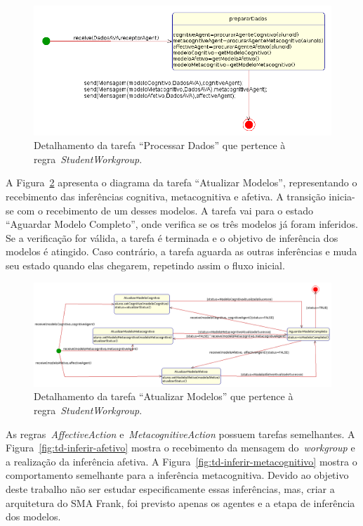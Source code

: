 \begin{figure}
	\centering
	\includegraphics[scale=0.48]{images/td-processar-dados.png}
	\caption{Detalhamento da tarefa ``Processar Dados'' que pertence à regra~\emph{StudentWorkgroup}.}
	\label{fig:td-processar-dados}
\end{figure}

A Figura~\ref{fig:td-atualizar-modelos} apresenta o diagrama da tarefa ``Atualizar Modelos'', representando o recebimento das inferências cognitiva, metacognitiva e afetiva. A transição inicia-se com o recebimento de um desses modelos. A tarefa vai para o estado ``Aguardar Modelo Completo'', onde verifica se os três modelos já foram inferidos. Se a verificação for válida, a tarefa é terminada e o objetivo de inferência dos modelos é atingido. Caso contrário, a tarefa aguarda as outras inferências e muda seu estado quando elas chegarem, repetindo assim o fluxo inicial.

\begin{figure}
	\centering
	\includegraphics[scale=0.4]{images/td-atualizar-modelos.png}
	\caption{Detalhamento da tarefa ``Atualizar Modelos'' que pertence à regra~\emph{StudentWorkgroup}.}
	\label{fig:td-atualizar-modelos}
\end{figure}

As regras~\emph{AffectiveAction} e~\emph{MetacognitiveAction} possuem tarefas semelhantes. A Figura~\ref{fig:td-inferir-afetivo} mostra o recebimento da mensagem do~\emph{workgroup} e a realização da inferência afetiva. A Figura~\ref{fig:td-inferir-metacognitivo} mostra o comportamento semelhante para a inferência metacognitiva. Devido ao objetivo deste trabalho não ser estudar especificamente essas inferências, mas, criar a arquitetura do SMA Frank, foi previsto apenas os agentes e a etapa de inferência dos modelos.

